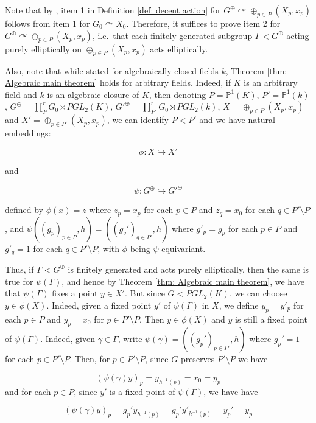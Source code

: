 \documentclass[12pt]{article}
\theoremstyle{definition}
\begin{document}
Note that by \cite[Lemma 4.2]{Algebraic}, item 1 in Definition \ref{def: decent action} for $G^{\oplus} \curvearrowright \oplus_{p \in P} (X_p, x_p)$ follows from item 1 for $G_0 \curvearrowright X_0$. Therefore, it suffices to prove item 2 for $G^{\oplus} \curvearrowright \oplus_{p \in P} (X_p, x_p)$, i.e.\ that each finitely generated subgroup $\Gamma < G^{\oplus}$ acting purely elliptically on $\oplus_{p \in P} (X_p, x_p)$ acts elliptically. 

Also, note that while stated for algebraically closed fields $k$, Theorem \ref{thm: Algebraic main theorem} holds for arbitrary fields. Indeed, if $K$ is an arbitrary field and $k$ is an algebraic closure of $K$, then denoting $P = \mathbb{P}^1(K)$, $P' = \mathbb{P}^1(k)$, $G^{\oplus} = \prod_P^r G_0 \rtimes PGL_2(K)$, $G'^{\oplus} = \prod_{P'}^r G_0 \rtimes PGL_2(k)$, $X = \oplus_{p \in P} (X_p, x_p)$ and $X'=\oplus_{p \in P'} (X_p, x_p)$, we can identify $P < P'$ and we have natural embeddings:

$$\phi:X \hookrightarrow X'$$

and

$$\psi:G^{\oplus} \hookrightarrow G'^{\oplus}$$

defined by $\phi(x) = z$ where $z_p = x_p$ for each $p \in P$ and $z_q = x_0$ for each $q \in P' \setminus P$, and $\psi((g_p)_{p \in P}, h) = ((g_q')_{q \in P'},h)$ where $g'_p = g_p$ for each $p \in P$ and $g'_q = 1$ for each $q \in P' \setminus P$, with $\phi$ being $\psi$-equivariant.

Thus, if $\Gamma < G^{\oplus}$ is finitely generated and acts purely elliptically, then the same is true for $\psi(\Gamma)$, and hence by Theorem \ref{thm: Algebraic main theorem}, we have that $\psi(\Gamma)$ fixes a point $y \in X'$. But since $G < PGL_2(K)$, we can choose $y \in \phi(X)$. Indeed, given a fixed point $y'$ of $\psi(\Gamma)$ in $X$, we define $y_p = y'_p$ for each $p \in P$ and $y_p = x_0$ for $p \in P' \setminus P$. Then $y \in \phi(X)$ and $y$ is still a fixed point of $\psi(\Gamma)$. Indeed, given $\gamma \in \Gamma$, write $\psi(\gamma) = ((g_p')_{p \in P'}, h)$ where $g_p' = 1$ for each $p \in P' \setminus P$. Then, for $p \in P' \setminus P$, since $G$ preserves $P' \setminus P$ we have 

$$(\psi(\gamma)y)_p = y_{h^{-1}(p)} = x_0 = y_p$$  and for each $p \in P$, since $y'$ is a fixed point of $\psi(\Gamma)$, we have have 

$$(\psi(\gamma)y)_p = g_p' y_{h^{-1}(p)} = g_p' y'_{h^{-1}(p)} = y_p' = y_p$$
\end{document}

